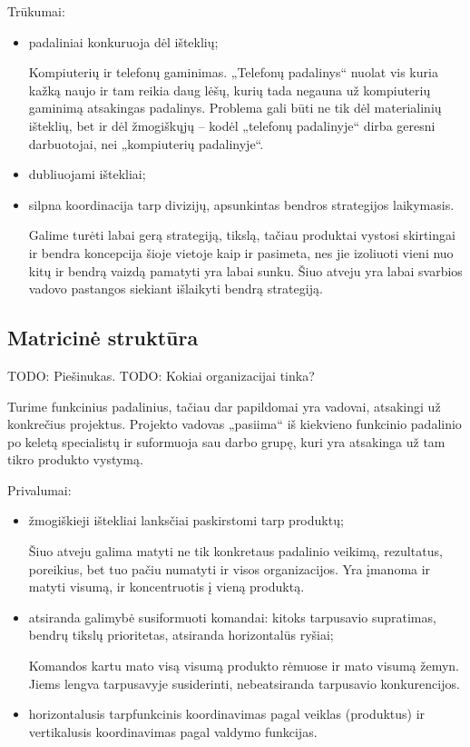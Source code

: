 Trūkumai:
\begin{itemize}
  \item padaliniai konkuruoja dėl išteklių;
    \begin{exmp}
      Kompiuterių ir telefonų gaminimas. „Telefonų padalinys“ nuolat
      vis kuria kažką naujo ir tam reikia daug lėšų, kurių tada negauna
      už kompiuterių gaminimą atsakingas padalinys. Problema gali būti
      ne tik dėl materialinių išteklių, bet ir dėl žmogiškųjų – kodėl
      „telefonų padalinyje“ dirba geresni darbuotojai, nei „kompiuterių
      padalinyje“.
    \end{exmp}
  \item dubliuojami ištekliai;
  \item silpna koordinacija tarp divizijų, apsunkintas bendros strategijos
    laikymasis.
    \begin{note}
      Galime turėti labai gerą strategiją, tikslą, tačiau produktai
      vystosi skirtingai ir bendra koncepcija šioje vietoje kaip ir
      pasimeta, nes jie izoliuoti vieni nuo kitų ir bendrą vaizdą
      pamatyti yra labai sunku. Šiuo atveju yra labai svarbios
      vadovo pastangos siekiant išlaikyti bendrą strategiją.
    \end{note}
\end{itemize}

\subsection{Matricinė struktūra}

TODO: Piešinukas.
TODO: Kokiai organizacijai tinka?

Turime funkcinius padalinius, tačiau dar papildomai yra vadovai,
atsakingi už konkrečius projektus. Projekto vadovas „pasiima“ iš
kiekvieno funkcinio padalinio po keletą specialistų ir suformuoja
sau darbo grupę, kuri yra atsakinga už tam tikro produkto vystymą.

Privalumai:
\begin{itemize}
  \item žmogiškieji ištekliai lanksčiai paskirstomi tarp produktų;
    \begin{note}
      Šiuo atveju galima matyti ne tik konkretaus padalinio veikimą,
      rezultatus, poreikius, bet tuo pačiu numatyti ir visos
      organizacijos. Yra įmanoma ir matyti visumą, ir koncentruotis į
      vieną produktą.
    \end{note}
  \item atsiranda galimybė susiformuoti komandai: kitoks tarpusavio 
    supratimas, bendrų tikslų prioritetas, atsiranda horizontalūs
    ryšiai;
    \begin{note}
      Komandos kartu mato visą visumą produkto rėmuose ir mato visumą
      žemyn. Jiems lengva tarpusavyje susiderinti, nebeatsiranda
      tarpusavio konkurencijos.
    \end{note}
  \item horizontalusis tarpfunkcinis koordinavimas pagal veiklas 
    (produktus) ir vertikalusis koordinavimas pagal valdymo funkcijas.
\end{itemize}

